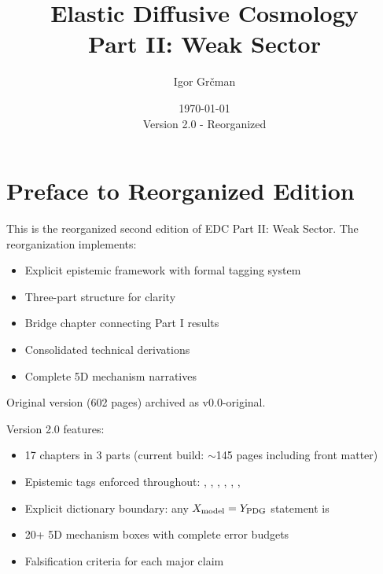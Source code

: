 \documentclass[11pt,a4paper,twoside]{book}
\title{Elastic Diffusive Cosmology\\
       \Large Part II: Weak Sector}
\author{Igor Grčman}
\date{\today\\Version 2.0 - Reorganized}
\theoremstyle{definition}
\theoremstyle{plain}
\begin{document}
\frontmatter

\maketitle

\newpage


\tableofcontents

\chapter*{Preface to Reorganized Edition}

This is the reorganized second edition of EDC Part II: Weak Sector.
The reorganization implements:
\begin{itemize}
\item Explicit epistemic framework with formal tagging system
\item Three-part structure for clarity
\item Bridge chapter connecting Part I results
\item Consolidated technical derivations
\item Complete 5D mechanism narratives
\end{itemize}

Original version (602 pages) archived as v0.0-original.

Version 2.0 features:
\begin{itemize}
\item 17 chapters in 3 parts (current build: $\sim$145 pages including front matter)
\item Epistemic tags enforced throughout: \tagM{}, \tagP{}, \tagDer{}, \tagDc{}, \tagCal{}, \tagI{}, \tagOpen{}
\item Explicit dictionary boundary: any $X_{\rm model} = Y_{\rm PDG}$ statement is \tagDc{}
\item 20+ 5D mechanism boxes with complete error budgets
\item Falsification criteria for each major claim
\end{itemize}
\end{document}
